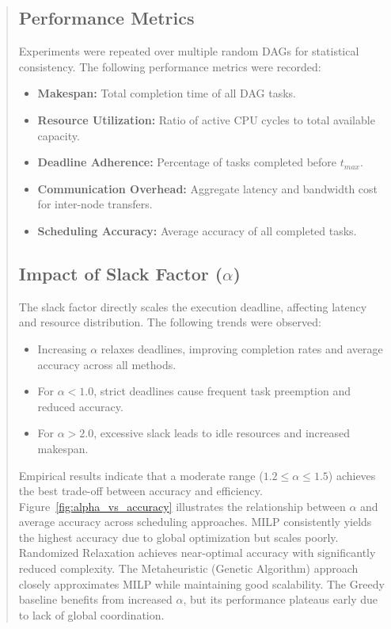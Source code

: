 \documentclass[conference]{IEEEtran}
\begin{document}
\begin{abstract}
\subsection{Performance Metrics}

Experiments were repeated over multiple random DAGs for statistical consistency. The following performance metrics were recorded:

\begin{itemize}
    \item \textbf{Makespan:} Total completion time of all DAG tasks.
    \item \textbf{Resource Utilization:} Ratio of active CPU cycles to total available capacity.
    \item \textbf{Deadline Adherence:} Percentage of tasks completed before $t_{max}$.
    \item \textbf{Communication Overhead:} Aggregate latency and bandwidth cost for inter-node transfers.
    \item \textbf{Scheduling Accuracy:} Average accuracy of all completed tasks.
\end{itemize}

\subsection{Impact of Slack Factor ($\alpha$)}

The slack factor directly scales the execution deadline, affecting latency and resource distribution. The following trends were observed:

\begin{itemize}
    \item Increasing $\alpha$ relaxes deadlines, improving completion rates and average accuracy across all methods.
    \item For $\alpha < 1.0$, strict deadlines cause frequent task preemption and reduced accuracy.
    \item For $\alpha > 2.0$, excessive slack leads to idle resources and increased makespan.
\end{itemize}

Empirical results indicate that a moderate range ($1.2 \le \alpha \le 1.5$) achieves the best trade-off between accuracy and efficiency.  
Figure~\ref{fig:alpha_vs_accuracy} illustrates the relationship between $\alpha$ and average accuracy across scheduling approaches. MILP consistently yields the highest accuracy due to global optimization but scales poorly. Randomized Relaxation achieves near-optimal accuracy with significantly reduced complexity. The Metaheuristic (Genetic Algorithm) approach closely approximates MILP while maintaining good scalability. The Greedy baseline benefits from increased $\alpha$, but its performance plateaus early due to lack of global coordination.




\end{abstract}
\end{document}
